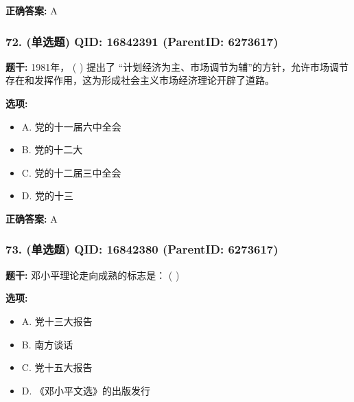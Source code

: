 \documentclass[12pt,UTF8]{ctexart}
\begin{document}
\textbf{正确答案:}
A

\vspace{0.3em}\hrulefill\vspace{0.7em}

\subsubsection*{72. (单选题) \small QID: 16842391 (ParentID: 6273617)}

\textbf{题干:}
1981年， ( ) 提出了 “计划经济为主、市场调节为辅”的方针，允许市场调节存在和发挥作用，这为形成社会主义市场经济理论开辟了道路。



\textbf{选项:}
\begin{itemize}[leftmargin=*]

  \item A. 党的十一届六中全会

  \item B. 党的十二大

  \item C. 党的十二届三中全会

  \item D. 党的十三

\end{itemize}

\textbf{正确答案:}
A

\vspace{0.3em}\hrulefill\vspace{0.7em}

\subsubsection*{73. (单选题) \small QID: 16842380 (ParentID: 6273617)}

\textbf{题干:}
邓小平理论走向成熟的标志是： ( )



\textbf{选项:}
\begin{itemize}[leftmargin=*]

  \item A. 党十三大报告

  \item B. 南方谈话

  \item C. 党十五大报告

  \item D. 《邓小平文选》的出版发行

\end{itemize}
\end{document}
